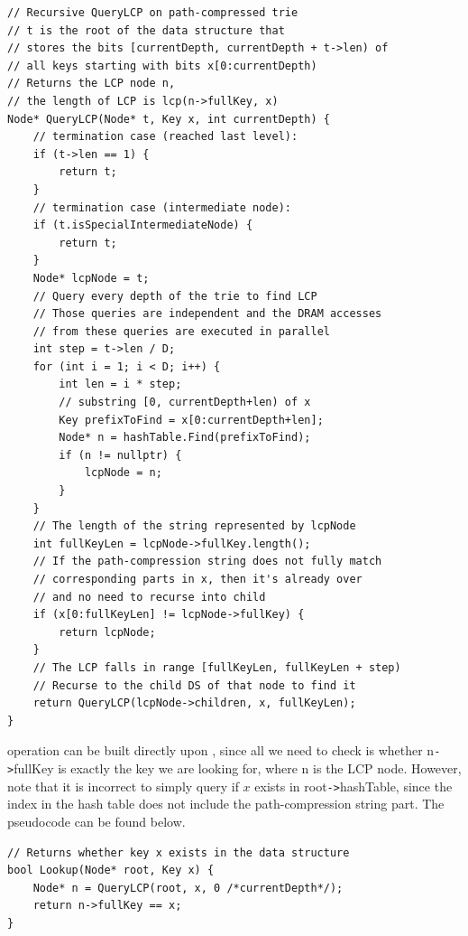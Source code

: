 \documentclass[11pt, usletter]{article}
\begin{document}
\singlespacing\begin{codebox}
\begin{verbatim}
// Recursive QueryLCP on path-compressed trie
// t is the root of the data structure that 
// stores the bits [currentDepth, currentDepth + t->len) of 
// all keys starting with bits x[0:currentDepth)
// Returns the LCP node n, 
// the length of LCP is lcp(n->fullKey, x)
Node* QueryLCP(Node* t, Key x, int currentDepth) {
    // termination case (reached last level):
    if (t->len == 1) {
        return t;
    }
    // termination case (intermediate node):
    if (t.isSpecialIntermediateNode) {
        return t;
    }
    Node* lcpNode = t;
    // Query every depth of the trie to find LCP
    // Those queries are independent and the DRAM accesses 
    // from these queries are executed in parallel
    int step = t->len / D;
    for (int i = 1; i < D; i++) {
        int len = i * step;
        // substring [0, currentDepth+len) of x
        Key prefixToFind = x[0:currentDepth+len];
        Node* n = hashTable.Find(prefixToFind);
        if (n != nullptr) {
            lcpNode = n;
        } 
    }
    // The length of the string represented by lcpNode
    int fullKeyLen = lcpNode->fullKey.length();
    // If the path-compression string does not fully match 
    // corresponding parts in x, then it's already over
    // and no need to recurse into child
    if (x[0:fullKeyLen] != lcpNode->fullKey) {
        return lcpNode;
    }
    // The LCP falls in range [fullKeyLen, fullKeyLen + step)
    // Recurse to the child DS of that node to find it
    return QueryLCP(lcpNode->children, x, fullKeyLen);
}
\end{verbatim}
\end{codebox}\doublespacing

\lookup operation can be built directly upon \QueryLCP, 
since all we need to check is whether n\verb|->|fullKey is exactly the key we are looking for, 
where n is the LCP node.
However, note that it is incorrect to simply query if $x$ exists in root\verb|->|hashTable, 
since the index in the hash table does not include the path-compression string part.
The pseudocode can be found below.

\singlespacing\begin{codebox}
\begin{verbatim}
// Returns whether key x exists in the data structure
bool Lookup(Node* root, Key x) {
    Node* n = QueryLCP(root, x, 0 /*currentDepth*/);
    return n->fullKey == x;
}
\end{verbatim}
\end{codebox}\doublespacing
\end{document}
